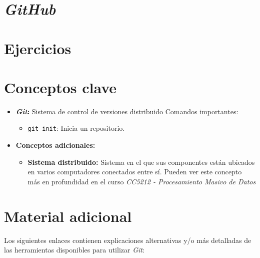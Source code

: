   \section{\textit{GitHub}}
    \label{sec:github}

  \section{Ejercicios}
  \section{Conceptos clave}
    \begin{itemize}
      \item \textbf{\textit{Git}:} Sistema de control de versiones distribuido
        Comandos importantes:
        \begin{itemize}
          \item \texttt{git init}: Inicia un repositorio.
        \end{itemize}
      \item \textbf{Conceptos adicionales:}
        \begin{itemize}
          \item \textbf{Sistema distribuido:\label{kw:distr-sist}}
            Sistema en el que sus componentes están ubicados en varios computadores 
            conectados entre sí.
            Pueden ver este concepto más en profundidad en el curso \textit{CC5212 - 
            Procesamiento Masivo de Datos}
        \end{itemize} 
    \end{itemize}
  \section{Material adicional}
    Los siguientes enlaces contienen explicaciones alternativas y/o más detalladas de
    las herramientas disponibles para utilizar \textit{Git}:
    
